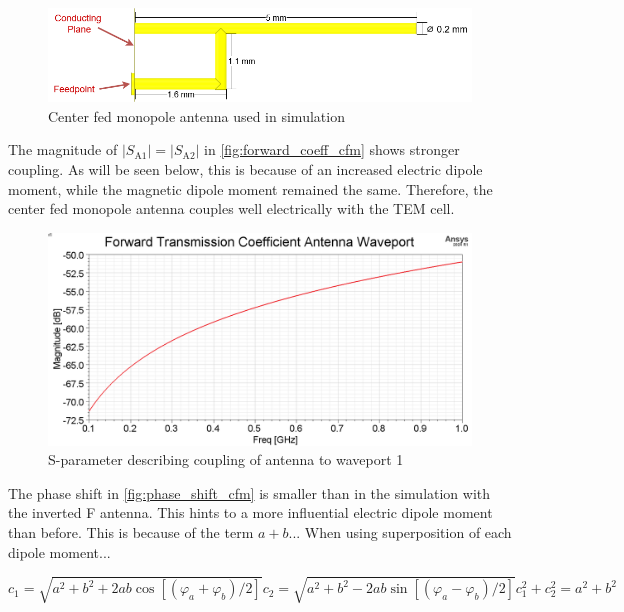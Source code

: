 \begin{figure}[h]
    \centering
    \includegraphics[width=0.75\linewidth]{Documentation//content//30_simulations//img/center_fed_monopole.png}
    \caption{Center fed monopole antenna used in simulation}
    \label{fig:center_fed_monopole}
\end{figure}

The magnitude of $|S_\mathrm{A1}|=|S_\mathrm{A2}|$ in \autoref{fig:forward_coeff_cfm} shows stronger coupling. As will be seen below, this is because of an increased electric dipole moment, while the magnetic dipole moment remained the same. Therefore, the center fed monopole antenna couples well electrically with the TEM cell.

\begin{figure}[h]
    \centering
    \includegraphics[width=1\linewidth]{Documentation//content//30_simulations//img/forward_coeff_cfm.png}
    \caption{S-parameter describing coupling of antenna to waveport 1}
    \label{fig:forward_coeff_cfm}
\end{figure}

The phase shift in \autoref{fig:phase_shift_cfm} is smaller than in the simulation with the inverted F antenna. This hints to a more influential electric dipole moment than before. This is because of the term $a+b$... When using superposition of each dipole moment...

\begin{subequations}
    \begin{equation}
        c_1 = \sqrt{a^2+b^2+2ab\cos{\left[ (\varphi_a + \varphi_b) / 2 \right]}}
    \end{equation}
        \begin{equation}
        c_2 = \sqrt{a^2+b^2-2ab\sin{\left[ (\varphi_a - \varphi_b) / 2 \right]}}
    \end{equation}
    \begin{equation}
        c_1^2+c_2^2= a^2+b^2
    \end{equation}
\end{subequations}
    

